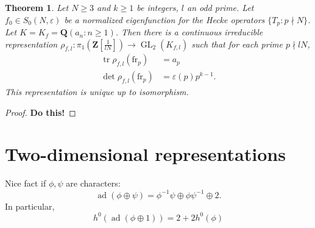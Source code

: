 \documentclass{article}
\DeclareMathOperator{\adjoint}{ad}
\DeclareMathOperator{\GL}{GL}
\DeclareMathOperator{\trace}{tr}
\newcommand{\dQ}{\mathbf{Q}}
\newcommand{\dZ}{\mathbf{Z}}
\newcommand{\arithfrob}{\mathrm{fr}}
\newtheorem{theorem}[subsection]{Theorem}
\begin{document}
\begin{theorem}
Let $N\geqslant 3$ and $k\geqslant 1$ be integers, $l$ an odd prime. Let 
$f_0\in S_0(N,\varepsilon)$ be a normalized eigenfunction for the Hecke 
operators $\{T_p:p\nmid N\}$. Let $K=K_f=\dQ(a_n:n\geqslant 1)$. 
Then there is a continuous irreducible representation 
$\rho_{f,l}:\pi_1\left(\dZ[\frac{1}{l N}]\right)\to \GL_2(K_{f,l})$ such that 
for each prime $p\nmid l N$, 
\begin{align*}
  \trace \rho_{f,l}(\arithfrob_p) &= a_p \\
  \det \rho_{f,l}(\arithfrob_p) &= \varepsilon(p) p^{k-1} .
\end{align*}
This representation is unique up to isomorphism. 
\end{theorem}
\begin{proof}
\textbf{Do this!}
\end{proof}





\section{Two-dimensional representations}

Nice fact if $\phi,\psi$ are characters: 
\[
  \adjoint(\phi\oplus \psi) = \phi^{-1}\psi\oplus \phi\psi^{-1}\oplus 2 .
\]
In particular, 
\[
  h^0(\adjoint(\phi\oplus 1)) = 2+2 h^0(\phi)
\]







\end{document}
